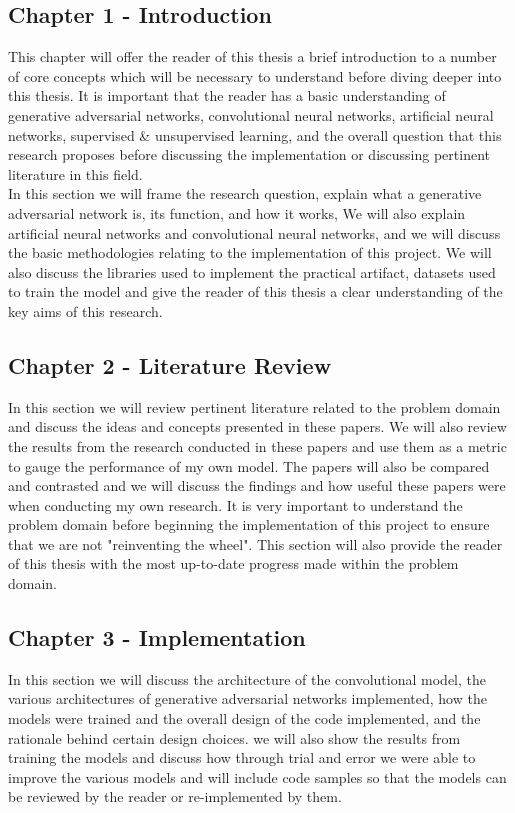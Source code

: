 \subsection{Chapter 1 - Introduction} 
This chapter will offer the reader of this thesis a brief introduction to a number of core concepts which will be necessary to understand before diving deeper into this thesis.  It is important that the reader has a basic understanding of generative adversarial networks, convolutional neural networks, artificial neural networks, supervised \& unsupervised learning, and the overall question that this research proposes before discussing the implementation or discussing pertinent literature in this field. 
\\
In this section we will frame the research question, explain what a generative adversarial network is, its function, and how it works,  We will also explain artificial neural networks and convolutional neural networks, and we will discuss the basic methodologies relating to the implementation of this project.  We will also discuss the libraries used to implement the practical artifact, datasets used to train the model and give the reader of this thesis a clear understanding of the key aims of this research.
\subsection{Chapter 2 - Literature Review} 
In this section we will review pertinent literature related to the problem domain and discuss the ideas and concepts presented in these papers. We will also review the results from the research conducted in these papers and use them as a metric to gauge the performance of my own model.  The papers will also be compared and contrasted and we will discuss the findings and how useful these papers were when conducting my own research.  It is very important to understand the problem domain before beginning the implementation of this project to ensure that we are not "reinventing the wheel".  This section will also provide the reader of this thesis with the most up-to-date progress made within the problem domain.
\subsection{Chapter 3 - Implementation}
In this section we will discuss the architecture of the convolutional model, the various architectures of generative adversarial networks implemented, how the models were trained and the overall design of the code implemented, and the rationale behind certain design choices. we will also show the results from training the models and discuss how through trial and error we were able to improve the various models and will include code samples so that the models can be reviewed by the reader or re-implemented by them.
